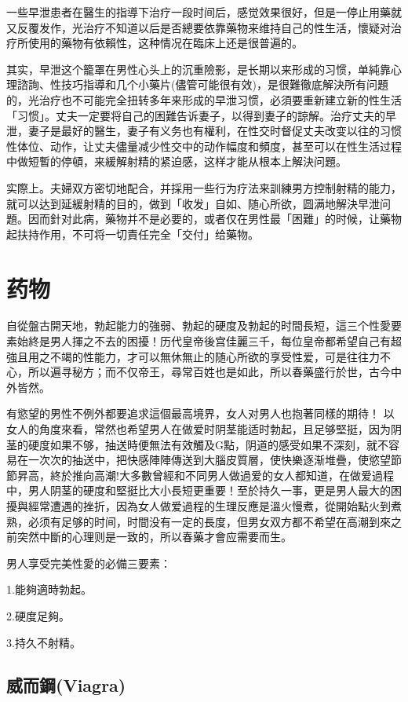 \documentclass[12pt,UTF8]{ctexbook}
\begin{document}
一些早泄患者在醫生的指導下治疗一段时间后，感觉效果很好，但是一停止用藥就又反覆发作，光治疗不知道以后是否總要依靠藥物来维持自己的性生活，懷疑对治疗所使用的藥物有依賴性，这种情况在臨床上还是很普遍的。

其实，早泄这个籠罩在男性心头上的沉重險影，是长期以来形成的习惯，单純靠心理諮詢、性技巧指導和几个小藥片(儘管可能很有效)，是很難徹底解決所有问題的，光治疗也不可能完全扭转多年来形成的早泄习惯，必須要重新建立新的性生活「习惯」。丈夫一定要将自己的困難告诉妻子，以得到妻子的諒解。治疗丈夫的早泄，妻子是最好的醫生，妻子有义务也有權利，在性交时督促丈夫改变以往的习惯性体位、动作，让丈夫儘量减少性交中的动作幅度和頻度，甚至可以在性生活过程中做短暫的停頓，来緩解射精的紧迫感，这样才能从根本上解決问題。

实際上。夫婦双方密切地配合，并採用一些行为疗法来訓練男方控制射精的能力，就可以达到延緩射精的目的，做到「收发」自如、随心所欲，圆满地解決早泄问題。因而針对此病，藥物并不是必要的，或者仅在男性最「困難」的时候，让藥物起扶持作用，不可将一切責任完全「交付」给藥物。

\chapter{药物}

自從盤古開天地，勃起能力的強弱、勃起的硬度及勃起的时間長短，這三个性愛要素始終是男人揮之不去的困擾！历代皇帝後宫佳麗三千，每位皇帝都希望自己有超強且用之不竭的性能力，才可以無休無止的随心所欲的享受性爱，可是往往力不心，所以遍寻秘方；而不仅帝王，尋常百姓也是如此，所以春藥盛行於世，古今中外皆然。

有慾望的男性不例外都要追求這個最高境界，女人对男人也抱著同樣的期待！
以女人的角度來看，常然也希望男人在做爱时阴茎能适时勃起，且足够堅挺，因为阴茎的硬度如果不够，抽送時便無法有效觸及G點，阴道的感受如果不深刻，就不容易在一次次的抽送中，把快感陣陣傳送到大腦皮質層，使快樂逐渐堆疊，使慾望節節昇高，終於推向高潮!大多數曾經和不同男人做過爱的女人都知道，在做爱過程中，男人阴茎的硬度和堅挺比大小長短更重要！至於持久一事，更是男人最大的困擾與經常遭遇的挫折，因為女人做爱過程的生理反應是溫火慢煮，從開始點火到煮熟，必须有足够的时间，时間没有一定的長度，但男女双方都不希望在高潮到來之前突然中斷的心理则是一致的，所以春藥才會应需要而生。

男人享受完美性愛的必備三要素：

1.能夠適時勃起。

2.硬度足夠。

3.持久不射精。

\section{威而鋼(Viagra)}
\end{document}
